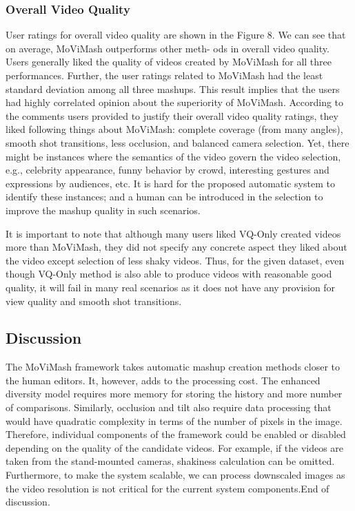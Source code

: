 \documentclass{sig-alternate-05-2015}
\begin{document}
\subsubsection{Overall Video Quality}
User ratings for overall video quality are shown in the Figure 8.
We can see that on average, MoViMash outperforms other meth-
ods in overall video quality. Users generally liked the quality of
videos created by MoViMash for all three performances. Further,
the user ratings related to MoViMash had the least standard deviation among all three mashups. This result implies that the users
had highly correlated opinion about the superiority of MoViMash.
According to the comments users provided to justify their overall
video quality ratings, they liked following things about MoViMash:
complete coverage (from many angles), smooth shot transitions,
less occlusion, and balanced camera selection. Yet, there might
be instances where the semantics of the video govern the video
selection, e.g., celebrity appearance, funny behavior by crowd, interesting gestures and expressions by audiences, etc. It is hard for
the proposed automatic system to identify these instances; and a
human can be introduced in the selection to improve the mashup
quality in such scenarios.

It is important to note that although many users liked VQ-Only
created videos more than MoViMash, they did not specify any concrete aspect they liked about the video except selection of less
shaky videos. Thus, for the given dataset, even though VQ-Only
method is also able to produce videos with reasonable good quality,
it will fail in many real scenarios as it does not have any provision
for view quality and smooth shot transitions.

\subsection{Discussion}
The MoViMash framework takes automatic mashup creation methods closer to the human editors. It, however, adds to the processing
cost. The enhanced diversity model requires more memory for storing the history and more number of comparisons. Similarly, occlusion and tilt also require data processing that would have quadratic
complexity in terms of the number of pixels in the image. Therefore, individual components of the framework could be enabled or
disabled depending on the quality of the candidate videos. For example, if the videos are taken from the stand-mounted cameras,
shakiness calculation can be omitted. Furthermore, to make the
system scalable, we can process downscaled images as the video resolution is not critical for the current system components.End of discussion.
\end{document}
